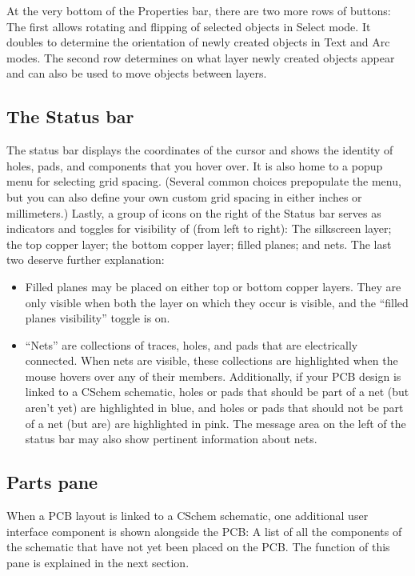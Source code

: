 \documentclass[11pt]{report}
\begin{document}
At the very bottom of the Properties bar, there are two more rows of
buttons: The first allows rotating and flipping of selected objects in
Select mode. It doubles to determine the orientation of newly created
objects in Text and Arc modes. The second row determines on what layer
newly created objects appear and can also be used to move objects
between layers.

\subsection{The Status bar}
The status bar displays the coordinates of the cursor and shows the
identity of holes, pads, and components that you hover over. It is
also home to a popup menu for selecting grid spacing. (Several common
choices prepopulate the menu, but you can also define your own custom
grid spacing in either inches or millimeters.) Lastly, a group of
icons on the right of the Status bar serves as indicators and toggles
for visibility of (from left to right): The silkscreen layer; the top
copper layer; the bottom copper layer; filled planes; and nets.
The
last two deserve further explanation:
\begin{itemize}
  \item Filled planes may be placed on
either top or bottom copper layers. They are only visible when both
the layer on which they occur is visible, and the ``filled planes
visibility'' toggle is on.
\item ``Nets'' are collections of traces, holes, and pads that are
  electrically connected. When nets are visible, these collections are
  highlighted when the mouse hovers over any of their
  members. Additionally, if your PCB design is linked to a CSchem
  schematic, holes or pads that should be part of a net (but
  aren't yet) are highlighted in blue, and holes or pads that should
  not be part of a net (but are) are highlighted in pink. The message
  area on the left of the status bar may also show pertinent
  information about nets.
\end{itemize}

\subsection{Parts pane}

When a PCB layout is linked to a CSchem schematic, one additional user
interface component is shown alongside the PCB: A list of all the
components of the schematic that have not yet been placed on the
PCB. The function of this pane is explained in the next section.
\end{document}
